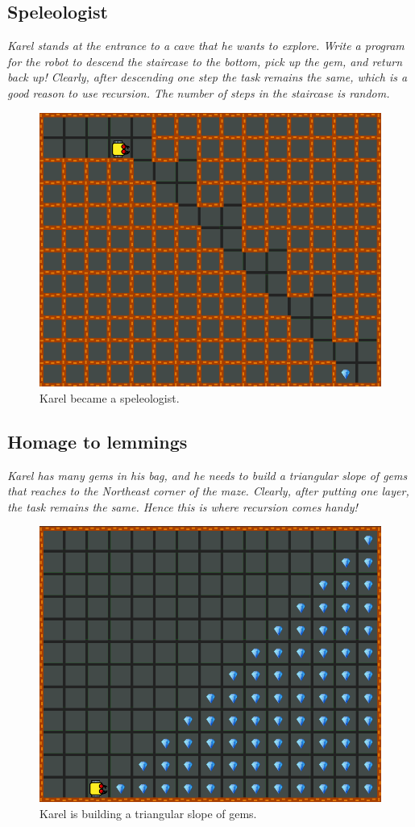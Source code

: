 \subsection{Speleologist}

{\em Karel stands at the entrance to a cave that he wants to explore. Write a program for the robot to descend the staircase to the bottom, pick up the gem, and return back up! Clearly, after descending one step the task remains the same, which is a good reason to use recursion. The number of steps in the staircase is random.}%

\begin{figure}[!ht]
\begin{center}
\includegraphics[height=0.4\textwidth]{img/g02.png}
\end{center}
\vspace{-4mm}
\caption{Karel became a speleologist.}
\label{fig:g02}
\end{figure}

\newpage


\subsection{Homage to lemmings}

{\em Karel has many gems in his bag, and he needs to build a triangular slope of gems that reaches to the Northeast corner of the maze. Clearly, after putting one layer, the task remains the same. Hence this is where recursion comes handy! }

\begin{figure}[!ht]
\begin{center}
\includegraphics[height=0.4\textwidth]{img/g03.png}
\end{center}
\vspace{-4mm}
\caption{Karel is building a triangular slope of gems.}
\label{fig:g03}
\vspace{-1cm}
\end{figure}
\newpage


